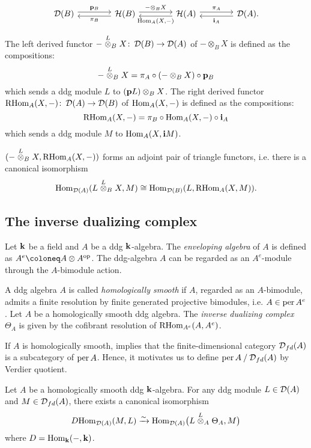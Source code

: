 \[
  \begin{tikzcd}[column sep=4em, every arrow/.append style=shift left]
    \D(B) \ar[r, "\Bp_B"]
    & \mathcal{H}(B) \ar[r, "- \otimes_B X"] \ar[l, "\pi_B"]
    & \mathcal{H}(A) \ar[l, "{\Hom_A(X, -)}"] \ar[r, "\pi_A"]
    & \D(A). \ar[l, "\Bi_A"]
  \end{tikzcd}
\]

The left derived functor $- \stackrel{L}{\otimes}_B X \colon \operatorname{\mathcal{D}}(B) \to \operatorname{\mathcal{D}}(A)$
of $- \otimes_B X$ is defined as the compositions:
\[ - \stackrel{L}{\otimes}_B X = \pi_A \circ (- \otimes_B X) \circ \mathbf{p}_B \]
which sends a ddg module $L$ to $(\mathbf{p} L) \otimes_B X$.
The right derived functor $\operatorname{RHom}_A(X, -) \colon \operatorname{\mathcal{D}}(A) \to \operatorname{\mathcal{D}}(B)$
of $\operatorname{Hom}_A(X, -)$ is defined as the compositions:
\[ \operatorname{RHom}_A(X, -) = \pi_B \circ \operatorname{Hom}_A(X, -) \circ \mathbf{i}_A \]
which sends a ddg module $M$ to $\operatorname{Hom}_A(X, \mathbf{i} M)$.
\begin{proposition}\cite{K1}
  $(- \stackrel{L}{\otimes}_B X, \operatorname{RHom}_A(X, -))$ forms an adjoint pair of triangle functors,
  i.e. there is a canonical isomorphism
  \[ \operatorname{Hom}_{\operatorname{\mathcal{D}}(A)}(L \stackrel{L}{\otimes}_B X, M) \cong \operatorname{Hom}_{\operatorname{\mathcal{D}}(B)}(L, \operatorname{RHom}_A(X, M)). \]
\end{proposition}

\subsection{The inverse dualizing complex}
Let $\mathbf{k}$ be a field and $A$ be a ddg $\mathbf{k}$-algebra.
The \textit{enveloping algebra} of $A$ is defined as $A^e \coloneq A \otimes A^{\rm op}$.
The ddg-algebra $A$ can be regarded
as an $A^e$-module through the $A$-bimodule action.

A ddg algebra $A$ is called \textit{homologically smooth} if $A$,
regarded as an $A$-bimodule,
admits a finite resolution by finite generated projective bimodules,
i.e. $A \in \operatorname{per} A^e$.
Let $A$ be a homologically smooth ddg algebra.
The \textit{inverse dualizing complex} $\Theta_A$
is given by the cofibrant resolution of $\operatorname{RHom}_{A^e}(A, A^e)$.
\begin{remark}
  If $A$ is homologically smooth,
  \cite[Lemma 4.1]{K1} implies that the finite-dimensional category
  $\operatorname{\mathcal{D}}_{fd}(A)$ is a subcategory of $\operatorname{per} A$.
  Hence, it motivates us to define $\operatorname{per} A \mathbin{/} \operatorname{\mathcal{D}}_{fd}(A)$ by Verdier quotient.
\end{remark}

\begin{lemma}\cite[Lemma 4.1]{K1}
  Let $A$ be a homologically smooth ddg $\mathbf{k}$-algebra.
  For any ddg module $L \in \operatorname{\mathcal{D}}(A)$ and $M \in \operatorname{\mathcal{D}}_{fd}(A)$,
  there exists a canonical isomorphism
  \[
    \operatorname{\mathnormal{D}Hom}_{\operatorname{\mathcal{D}}(A)}(M,L)
    \xrightarrow{\sim} \operatorname{Hom}_{\operatorname{\mathcal{D}}(A)}\bigl(L \stackrel{L}{\otimes}_A \Theta_A, M\bigr)
  \]
  where $D = \operatorname{Hom}_{\mathbf{k}}(-, \mathbf{k})$.
\end{lemma}


